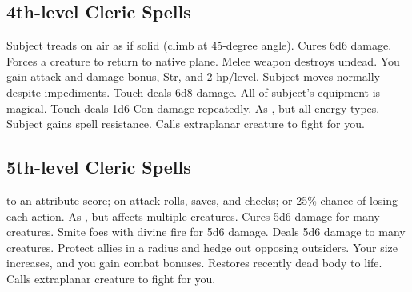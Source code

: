 \subsection{4th-level Cleric Spells}
\begin{spelllist}
   Subject treads on air as if solid (climb at 45-degree angle).
   Cures 6d6 damage.
   Forces a creature to return to native plane.
   Melee weapon destroys undead.
   You gain attack and damage bonus,  Str, and 2 hp/level.
   Subject moves normally despite impediments.
   Touch deals 6d8 damage.
   All of subject's equipment is magical.
   Touch deals 1d6 Con damage repeatedly.
   As , but all energy types.
   Subject gains spell resistance.
   Calls extraplanar creature to fight for you.
\end{spelllist}

\subsection{5th-level Cleric Spells}
\begin{spelllist}
    to an attribute score;  on attack rolls, saves, and checks; or 25\% chance of losing each action.
   As , but affects multiple creatures.
   Cures 5d6 damage for many creatures.
   Smite foes with divine fire for 5d6 damage.
   Deals 5d6 damage to many creatures.
   Protect allies in a \areamed radius and hedge out opposing outsiders.
   Your size increases, and you gain combat bonuses.
   Restores recently dead body to life.
   Calls extraplanar creature to fight for you.
\end{spelllist}

